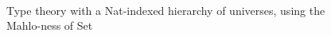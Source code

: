 \begin{figure}
\begin{code}
%
\>[2]\AgdaSpace{}%
\AgdaSpace{}%
\AgdaSymbol{=}\AgdaSpace{}%
\AgdaSpace{}%
\AgdaSymbol{(}\AgdaSpace{}%
\AgdaSymbol{)}\<%
\\
%
\\[\AgdaEmptyExtraSkip]%
%
\>[2]\AgdaSpace{}%
\AgdaSymbol{:}\AgdaSpace{}%
\AgdaSpace{}%
\AgdaSymbol{\{}\AgdaSymbol{\}}\AgdaSpace{}%
\AgdaSpace{}%
\AgdaSpace{}%
\AgdaSpace{}%
\AgdaSpace{}%
\<%
\\
%
\>[2]\AgdaSpace{}%
\AgdaSymbol{\{}\AgdaSymbol{\}}\AgdaSpace{}%
\AgdaSymbol{=}\AgdaSpace{}%
\AgdaSpace{}%
\AgdaSymbol{(}\AgdaSpace{}%
\AgdaSymbol{)}\<%
\end{code}
\caption{Type theory with a Nat-indexed hierarchy of universes, using the Mahlo-ness of Set}
\label{fig:maex}
\end{figure}
